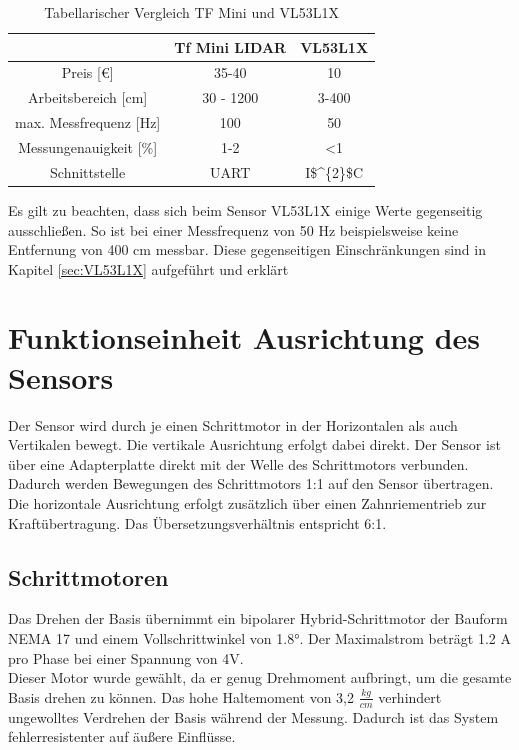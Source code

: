 \begin{table}[H]
	\centering
	\caption{Tabellarischer Vergleich TF Mini und VL53L1X}
	\begin{tabular}{|c|c|c|}
		\hline
		\textbf{} 				& \textbf{Tf Mini LIDAR}	& \textbf{VL53L1X} 	 \\ \hline
		Preis [€]				&  35-40					& 10			\\ \hline
		Arbeitsbereich [cm]		&  30 - 1200   				& 3-400			\\ \hline
		max. Messfrequenz [Hz]	&  100						& 50 			\\ \hline
		Messungenauigkeit [\%]	&  1-2 						& <1			\\ \hline
		Schnittstelle 			&  \ac{UART}				& \ac{I$^{2}$C}\\ \hline
 		
	\end {tabular}
	\label{vergleich}
\end{table}


Es gilt zu beachten, dass sich beim Sensor VL53L1X einige Werte gegenseitig ausschließen. So ist bei einer Messfrequenz von 50 Hz beispielsweise keine Entfernung von 400 cm messbar. Diese gegenseitigen Einschränkungen sind in Kapitel \ref{sec:VL53L1X} aufgeführt und erklärt

 

\section{Funktionseinheit Ausrichtung des Sensors}

Der Sensor wird durch je einen Schrittmotor in der Horizontalen als auch Vertikalen bewegt. Die vertikale Ausrichtung erfolgt dabei direkt. Der Sensor ist über eine Adapterplatte direkt mit der Welle des Schrittmotors verbunden. Dadurch werden Bewegungen des Schrittmotors 1:1 auf den Sensor übertragen.\\ 
Die horizontale Ausrichtung erfolgt zusätzlich über einen Zahnriementrieb zur Kraftübertragung. Das Übersetzungsverhältnis entspricht 6:1.  

\subsection{Schrittmotoren}
Das Drehen der Basis übernimmt ein bipolarer Hybrid-Schrittmotor der Bauform \ac{NEMA} 17 und einem Vollschrittwinkel von 1.8°. Der Maximalstrom beträgt 1.2 A pro Phase bei einer Spannung von 4V.\\ 
Dieser Motor wurde gewählt, da er genug Drehmoment aufbringt, um die gesamte Basis drehen zu können. Das hohe Haltemoment von 3,2 $\frac{kg}{cm}$ verhindert ungewolltes Verdrehen der Basis während der Messung. Dadurch ist das System fehlerresistenter auf äußere Einflüsse. \cite{NEMA17} 


